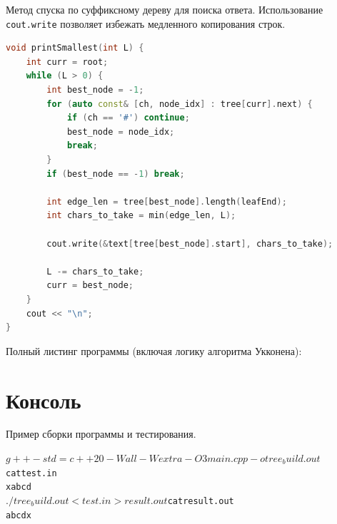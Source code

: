 Метод спуска по суффиксному дереву для поиска ответа. Использование \texttt{cout.write} позволяет избежать медленного копирования строк.

\begin{lstlisting}[language=C++]
void printSmallest(int L) {
    int curr = root;
    while (L > 0) {
        int best_node = -1;
        for (auto const& [ch, node_idx] : tree[curr].next) {
            if (ch == '#') continue;
            best_node = node_idx;
            break; 
        }
        if (best_node == -1) break;

        int edge_len = tree[best_node].length(leafEnd);
        int chars_to_take = min(edge_len, L);
        
        cout.write(&text[tree[best_node].start], chars_to_take);
        
        L -= chars_to_take;
        curr = best_node;
    }
    cout << "\n";
}
\end{lstlisting}

Полный листинг программы (включая логику алгоритма Укконена):


\pagebreak

\section{Консоль}
Пример сборки программы и тестирования.

\begin{alltt}
$ g++ -std=c++20 -Wall -Wextra -O3 main.cpp -o tree_build.out
$ cat test.in
xabcd
$ ./tree_build.out < test.in > result.out
$ cat result.out
abcdx
\end{alltt}
\pagebreak